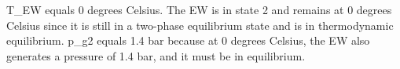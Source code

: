 T_EW equals 0 degrees Celsius.  
The EW is in state 2 and remains at 0 degrees Celsius since it is still in a two-phase equilibrium state and is in thermodynamic equilibrium.  
p_g2 equals 1.4 bar because at 0 degrees Celsius, the EW also generates a pressure of 1.4 bar, and it must be in equilibrium.